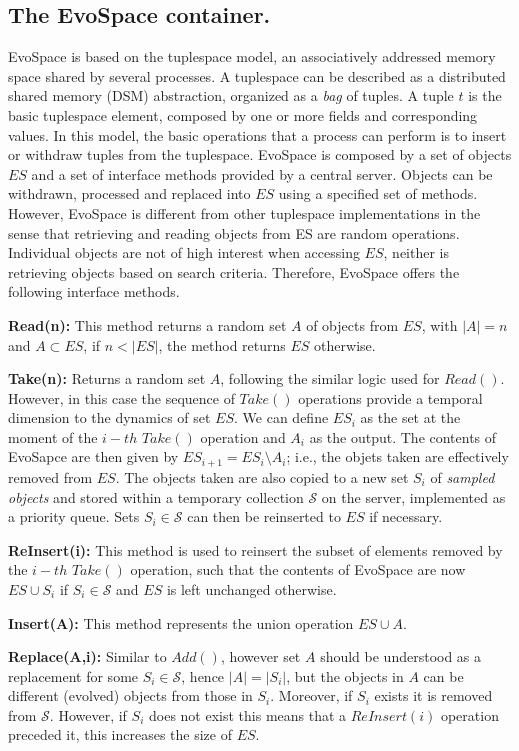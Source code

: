 \documentclass{llncs}
\begin{document}
\subsection{The EvoSpace container.}
EvoSpace is based on the tuplespace model, an associatively addressed memory space shared by several processes.
A tuplespace can be described as a distributed shared memory (DSM) abstraction, organized as a \emph{bag} of tuples.
A tuple $t$ is the basic tuplespace element, composed by one or more fields and corresponding values.
In this model, the basic operations that a process can perform is to insert or withdraw tuples from the tuplespace.
EvoSpace is composed by a set of objects $ES$ and a set of interface methods provided by a central server.
Objects can be withdrawn, processed and replaced into $ES$ using a specified set of methods.
However, EvoSpace is different from other tuplespace implementations in the sense that retrieving and reading objects from ES are random operations.
Individual objects are not of high interest when accessing $ES$, neither is retrieving objects based on search criteria.
Therefore, EvoSpace offers the following interface methods.


\textbf{Read(n):} This method returns a random set $A$ of objects from $ES$, with $|A|=n$ and $A\subset ES$, if $n< |ES|$, the method returns $ES$ otherwise.

\textbf{Take(n):} Returns a random set $A$, following the similar logic used for $Read()$.
However, in this case the sequence of $Take()$ operations provide a temporal dimension to the dynamics of set $ES$.
We can define $ES_i$ as the set at the moment of the $i-th$ $Take()$ operation and $A_i$ as the output.
The contents of EvoSapce are then given by $ES_{i+1}= ES_i \setminus A_i$; i.e., the objets taken are effectively removed from $ES$.
The objects taken are also copied to a new set $S_i$ of \emph{sampled objects} and stored
within a temporary collection $\mathcal{S}$ on the server, implemented as a priority queue.
Sets $S_i \in \mathcal{S}$ can then be reinserted to $ES$ if necessary.

\textbf{ReInsert(i):} This method is used to reinsert the subset of elements removed by the $i-th$ $Take()$ operation,
  such that the contents of EvoSpace are now $ES \cup S_i$ if $S_i \in \mathcal{S}$ and $ES$ is left unchanged otherwise.

\textbf{Insert(A):} This method represents the union operation $ES \cup A$.

\textbf{Replace(A,i):} Similar to $Add()$, however set $A$ should be understood as a replacement for
  some $S_i \in \mathcal{S}$, hence $|A| = |S_i|$, but the objects in $A$ can be different (evolved) objects from those in $S_i$.
  Moreover, if $S_i$ exists it is removed from $\mathcal{S}$.
  However, if $S_i$ does not exist this means that a $ReInsert(i)$ operation preceded it, this increases the size of $ES$.
\end{document}
